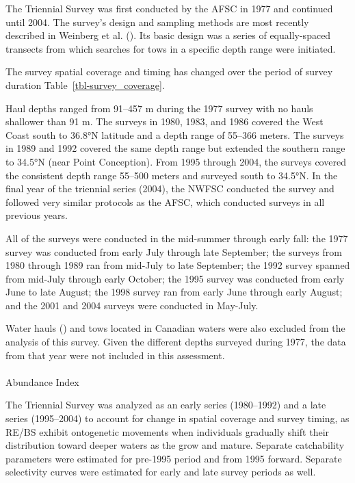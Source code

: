 \documentclass[
]{scrartcl}
\makeatletter
\let\oldparagraph\paragraph
\renewcommand{\paragraph}{
    \@ifstar
      \xxxParagraphStar
      \xxxParagraphNoStar
  }
\newcommand{\xxxParagraphStar}[1]{\oldparagraph*{#1}\mbox{}}
\newcommand{\xxxParagraphNoStar}[1]{\oldparagraph{#1}\mbox{}}
\makeatother
\begin{document}
The Triennial Survey was first conducted by the AFSC in 1977 and
continued until 2004. The survey's design and sampling methods are most
recently described in Weinberg et al.
(). Its basic design was a
series of equally-spaced transects from which searches for tows in a
specific depth range were initiated.

The survey spatial coverage and timing has changed over the period of
survey duration Table~\ref{tbl-survey_coverage}.

Haul depths ranged from 91--457 m during the 1977 survey with no hauls
shallower than 91 m. The surveys in 1980, 1983, and 1986 covered the
West Coast south to 36.8°N latitude and a depth range of 55--366 meters.
The surveys in 1989 and 1992 covered the same depth range but extended
the southern range to 34.5°N (near Point Conception). From 1995 through
2004, the surveys covered the consistent depth range 55--500 meters and
surveyed south to 34.5°N. In the final year of the triennial series
(2004), the NWFSC conducted the survey and followed very similar
protocols as the AFSC, which conducted surveys in all previous years.

All of the surveys were conducted in the mid-summer through early fall:
the 1977 survey was conducted from early July through late September;
the surveys from 1980 through 1989 ran from mid-July to late September;
the 1992 survey spanned from mid-July through early October; the 1995
survey was conducted from early June to late August; the 1998 survey ran
from early June through early August; and the 2001 and 2004 surveys were
conducted in May-July.

Water hauls () and
tows located in Canadian waters were also excluded from the analysis of
this survey. Given the different depths surveyed during 1977, the data
from that year were not included in this assessment.

\paragraph{Abundance Index}\label{abundance-index-1}

The Triennial Survey was analyzed as an early series (1980--1992) and a
late series (1995--2004) to account for change in spatial coverage and
survey timing, as RE/BS exhibit ontogenetic movements when individuals
gradually shift their distribution toward deeper waters as the grow and
mature. Separate catchability parameters were estimated for pre-1995
period and from 1995 forward. Separate selectivity curves were estimated
for early and late survey periods as well.
\end{document}
